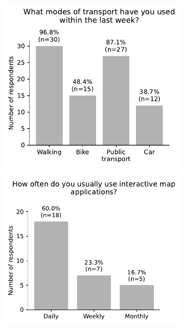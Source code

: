\begin{appendices}
\begin{figure}[H]
\begin{subfigure}[b]{0.5\textwidth}
	\end{subfigure}%
	\newline
	\begin{subfigure}[b]{0.5\textwidth}  %
		\includegraphics[width=\textwidth]{visual/figures/survey/modes.pdf}
	\end{subfigure}%
	\begin{subfigure}[b]{0.5\textwidth}
		\includegraphics[width=\textwidth]{visual/figures/survey/12.pdf}
	\end{subfigure}%
	\newline
\end{figure}


\end{appendices}
